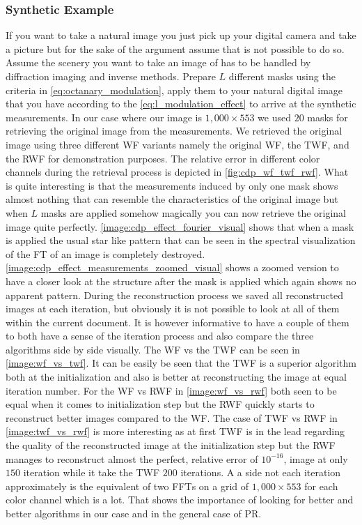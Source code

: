 \subsubsection{Synthetic Example}
If you want to take a natural image you just pick up your digital camera and take a picture but for the sake of the argument assume that is not possible to do so. 
Assume the scenery you want to take an image of has to be handled by diffraction imaging and inverse methods. Prepare $L$ different masks using the criteria in \cref{eq:octanary_modulation}, 
apply them to your natural digital image that you have according to the \cref{eq:l_modulation_effect} to arrive at the synthetic measurements. In our case where our image 
is $1,000 \times 553$ we used $20$ masks for retrieving the original image from the measurements. We retrieved the original image using three different \ac{WF} variants namely 
the original \ac{WF}, the \ac{TWF}, and the \ac{RWF} for demonstration purposes. The relative error in different color channels during the retrieval process is 
depicted in \cref{fig:cdp_wf_twf_rwf}. What is quite interesting is that the measurements induced by only one mask shows almost nothing that can resemble the characteristics 
of the original image but when $L$ masks are applied somehow magically you can now retrieve the original image quite perfectly. 
\cref{image:cdp_effect_fourier_visual} shows that when a mask is applied the usual star like pattern that can be seen in the spectral visualization of the 
\ac{FT} of an image is completely destroyed. \cref{image:cdp_effect_measurements_zoomed_visual} shows a zoomed version to have a closer 
look at the structure after the mask is applied which again shows no apparent pattern. During the reconstruction process we saved all reconstructed images at each iteration, but 
obviously it is not possible to look at all of them within the current document. It is however informative to have a couple of them to both have a sense 
of the iteration process and also compare the three algorithms side by side visually. The \ac{WF} vs the \ac{TWF} can be seen in \cref{image:wf_vs_twf}. It can be 
easily be seen that the \ac{TWF} is a superior algorithm both at the initialization and also is better at reconstructing the image at equal iteration number. For 
the \ac{WF} vs \ac{RWF} in \cref{image:wf_vs_rwf} both seen to be equal when it comes to initialization step but the \ac{RWF} quickly starts to reconstruct better 
images compared to the \ac{WF}. The case of \ac{TWF} vs \ac{RWF} in \cref{image:twf_vs_rwf} is more interesting as at first \ac{TWF} is in the lead regarding the 
quality of the reconstructed image at the initialization step but the \ac{RWF} manages to reconstruct almost the perfect, relative error of $10^{-16}$, image at only $150$ iteration 
while it take the \ac{TWF} $200$ iterations. A a side not each iteration approximately is the equivalent of two \textsc{FFT}s on a grid of $1,000 \times 553$ for each color channel which is a lot. 
That shows the importance of looking for better and better algorithms in our case and in the general case of \acl*{PR}.

